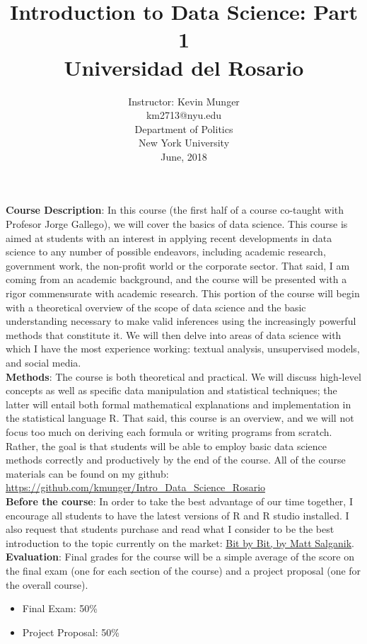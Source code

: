 \documentclass[]{article}
\title{Introduction to Data Science: Part 1\\Universidad del Rosario}
\author{Instructor: Kevin Munger\\km2713@nyu.edu\\ Department of Politics\\New York University\\June, 2018}
\date{}
\begin{document}
	

	\maketitle


	
	
	{\bf{Course Description}}: In this course (the first half of a course co-taught with Profesor Jorge Gallego), we will cover the basics of data science. This course is aimed at students with an interest in applying recent developments in data science to any number of possible endeavors, including academic research, government work, the non-profit world or the corporate sector. That said, I am coming from an academic background, and the course will be presented with a rigor commensurate with academic research. This portion of the course will begin with a theoretical overview of the scope of data science and the basic understanding necessary to make valid inferences using the increasingly powerful methods that constitute it. We will then delve into areas of data science with which I have the most experience working: textual analysis, unsupervised models, and social media.\\
	

	
	{\bf{Methods}}: The course is both theoretical and practical. We will discuss high-level concepts as well as specific data manipulation and statistical techniques; the latter will entail both formal mathematical explanations and implementation in the statistical language R. That said, this course is an overview, and we will not focus too much on deriving each formula or writing programs from scratch. Rather, the goal is that students will be able to employ basic data science methods correctly and productively by the end of the course. All of the course materials can be found on my github:
		\href{https://github.com/kmunger/Intro\_Data\_Science\_Rosario}{https://github.com/kmunger/Intro\_Data\_Science\_Rosario}\\
		
{\bf{Before the course}}: In order to take the best advantage of our time together, I encourage all students to have the latest versions of R and R studio installed. I also request that students purchase and read what I consider to be the best introduction to the topic currently on the market: \href{https://www.bitbybitbook.com/}{Bit by Bit, by Matt Salganik}. \\
		
	
	{\bf{Evaluation}}:
	Final grades for the course will be a simple average of the score on the final exam (one for each section of the course) and a project proposal (one for the overall course).\\
	\begin{itemize}
		\item Final Exam: 50\% 
		\item Project Proposal: 50\% 
	
	\end{itemize}
	
\end{document}
